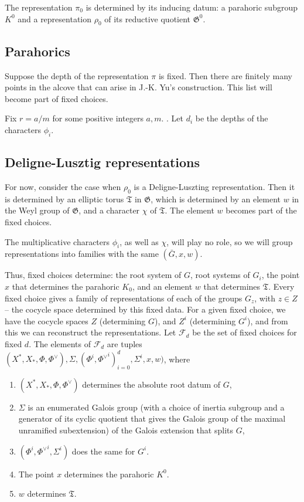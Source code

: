 \documentclass[12pt]{amsart}
\newcommand{\cF}{\mathcal{F}}
\def\cF{\mathcal{F}}
\newcommand{\fG}{\mathfrak G}
\newcommand{\fT}{\mathfrak T}
\theoremstyle{plain}
\theoremstyle{definition}
\begin{document}
The representation $\pi_0$ is determined by its inducing datum: a parahoric subgroup $K^0$ and a representation $\rho_0$ of its reductive quotient $\fG^0$. 

\subsection{Parahorics} Suppose the depth of the representation $\pi$ is fixed. Then there are finitely many points in the alcove that can arise in J.-K. Yu's construction. This list will become part of fixed choices. 

Fix $r=a/m$ for some positive integers $a, m$. .
Let $d_i$ be the depths of the characters $\phi_i$. 
  
\subsection{Deligne-Lusztig representations} 
For now, consider the case when $\rho_0$ is a Deligne-Luszting representation. 
Then it is determined by an elliptic torus $\fT$ in $\fG$, which is determined by an element $w$ in the Weyl group of $\fG$, and a character $\chi$ of $\fT$.  
The element $w$ becomes  part of the fixed choices.
  
The multiplicative characters $\phi_i$, as well as $\chi$, will play no role, so we will group 
representations into families with the same $(\bar G, x, w)$. 

Thus, fixed choices determine: the root system of $G$, root systems of $G_i$, 
the point $x$ that determines the parahoric $K_0$, and an element $w$ that determines 
$\fT$.  
Every fixed choice gives a family of representations of each of the groups $G_z$, with $z\in Z$ -- the cocycle space determined by this fixed data.
For a given fixed choice, we have the cocycle spaces $Z$ (determining $G$), and $Z^i$ (determining $G^i$), and from this we can reconstruct the representations. 
Let $\cF_d$ be the set of fixed choices for fixed $d$.
The elements of $\cF_d$ are tuples 
$(X^\ast, X_\ast, \Phi, \Phi^\vee), \Sigma, (\Phi^i, {\Phi^\vee}^i)_{i=0}^d, \Sigma^i, x, w)$, where 
\begin{enumerate}
\item  $(X^\ast, X_\ast, \Phi, \Phi^\vee)$  determines the absolute root datum of $G$, 
\item $\Sigma$ is an enumerated Galois group (with a choice of inertia subgroup and a 
generator of its cyclic quotient that gives the Galois group of the maximal unramified 
subextension) of the Galois extension that splits $G$,
\item  $(\Phi^i, {\Phi^\vee}^i, \Sigma^i)$ does the same for $G^i$. 
\item  The point $x$  determines the parahoric $K^0$.   
\item $w$ determines  $\fT$. 
\end{enumerate}
\end{document}
